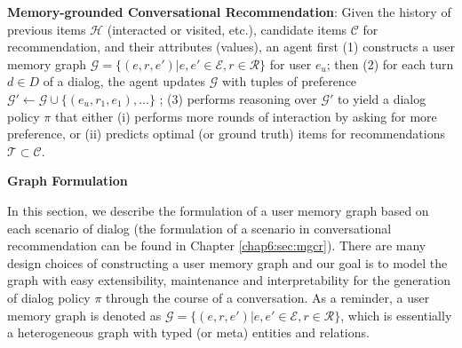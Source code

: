 \textbf{Memory-grounded Conversational Recommendation}:
Given the history of previous items $\mathcal{H}$ (interacted or visited, etc.), candidate items $\mathcal{C}$ for recommendation, and their attributes (values), 
an agent first (1) constructs a user memory graph $\mathcal{G} = \{(e, r, e')\vert e, e' \in \mathcal{E}, r \in \mathcal{R} \}$ for user $e_u$; 
then (2) for each turn $d \in D$ of a dialog, the agent updates $\mathcal{G}$ with tuples of preference $\mathcal{G}' \gets \mathcal{G} \cup \{(e_u, r_1, e_1), \dots\}$ ;
(3) performs reasoning over $\mathcal{G}'$ to yield a dialog policy $\pi$ that
either (i) performs more rounds of interaction by asking for more preference, 
or (ii) predicts optimal (or ground truth) items for recommendations $\mathcal{T} \subset \mathcal{C}$.

\textbf{Graph Formulation}
\label{chap5:sec:graph}

In this section, we describe the formulation of a user memory graph based on each scenario of dialog (the formulation of a scenario in conversational recommendation can be found in Chapter \ref{chap6:sec:mgcr}).
There are many design choices of constructing a user memory graph and our goal is to model the graph with easy extensibility, maintenance and interpretability for the generation of dialog policy $\pi$ through the course of a conversation.
As a reminder, a user memory graph is denoted as $\mathcal{G} = \{(e, r, e')\vert e, e' \in \mathcal{E}, r \in \mathcal{R} \}$, which is essentially a heterogeneous graph with typed (or meta) entities and relations. 

